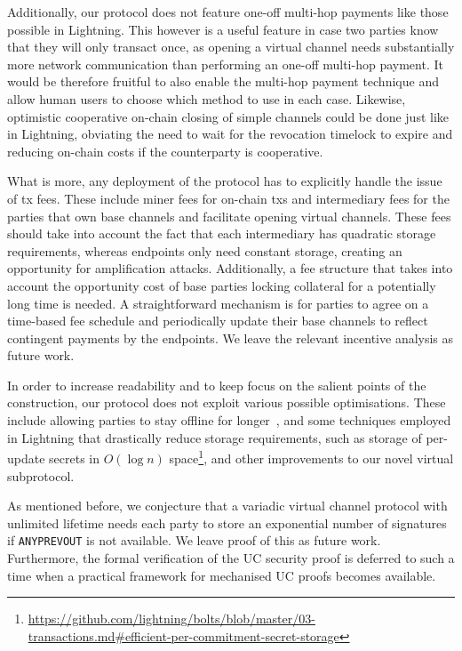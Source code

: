   Additionally, our protocol does not feature one-off multi-hop payments like
  those possible in Lightning. This however is a useful feature in case two
  parties know that they will only transact once, as opening a virtual channel
  needs substantially more network communication than performing an one-off
  multi-hop payment. It would be therefore fruitful to also enable the multi-hop
  payment technique and allow human users to choose which method to use in each
  case. Likewise, optimistic cooperative on-chain closing of simple channels
  could be done just like in Lightning, obviating the need to wait for the
  revocation timelock to expire and reducing on-chain costs if the counterparty
  is cooperative.

  What is more, any deployment of the protocol has to explicitly handle the issue
  of tx fees. These include miner fees for on-chain txs and
  intermediary fees for the parties that own base channels and facilitate
  opening virtual channels. These fees should take into account the fact that
  each intermediary has quadratic storage requirements, whereas endpoints only
  need constant storage, creating an opportunity for amplification attacks.
  Additionally, a fee structure that takes into account the opportunity cost of
  base parties locking collateral for a potentially long time is needed. A
  straightforward mechanism is for parties to agree on a time-based fee schedule
  and periodically update their base channels to reflect contingent payments by
  the endpoints. We leave the relevant incentive analysis as future work.

  In order to increase readability and to keep focus on the salient points of
  the construction, our protocol does not exploit various possible
  optimisations. These include allowing parties to stay offline for
  longer~\cite{DBLP:conf/ccs/AumayrTMMM22}, and some techniques employed in Lightning that
  drastically reduce storage requirements, such as storage of per-update secrets
  in $O(\log n)$
  space\footnote{\url{https://github.com/lightning/bolts/blob/master/03-transactions.md\#efficient-per-commitment-secret-storage}},
  and other improvements to our novel virtual subprotocol.

  As mentioned before, we conjecture that a variadic virtual
  channel protocol with unlimited lifetime needs each party to store an
  exponential number of signatures if \texttt{ANYPREVOUT} is not available. We
  leave proof of this as future work. Furthermore, the formal verification of
  the UC security proof is deferred to such a time when a practical framework
  for mechanised UC proofs becomes available.

